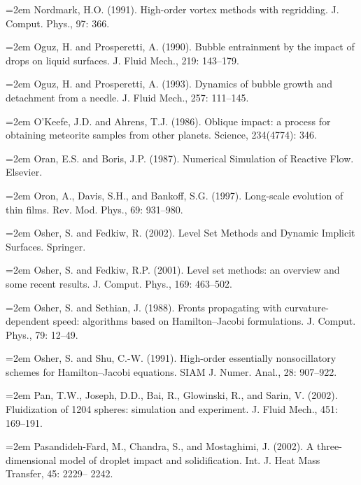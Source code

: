 \documentclass[11pt,a4paper,openany,fontset=none]{ctexbook}
\begin{document}
\par\hangindent=2em Nordmark, H.O. (1991). High-order vortex methods with regridding. J. Comput. Phys., 97: 366.

\par\hangindent=2em Oguz, H. and Prosperetti, A. (1990). Bubble entrainment by the impact of drops on liquid surfaces. J. Fluid Mech., 219: 143--179.

\par\hangindent=2em Oguz, H. and Prosperetti, A. (1993). Dynamics of bubble growth and detachment from a needle. J. Fluid Mech., 257: 111--145.

\par\hangindent=2em O’Keefe, J.D. and Ahrens, T.J. (1986). Oblique impact: a process for obtaining meteorite samples from other planets. Science, 234(4774): 346.

\par\hangindent=2em Oran, E.S. and Boris, J.P. (1987). Numerical Simulation of Reactive Flow. Elsevier.

\par\hangindent=2em Oron, A., Davis, S.H., and Bankoff, S.G. (1997). Long-scale evolution of thin films. Rev. Mod. Phys., 69: 931--980.

\par\hangindent=2em Osher, S. and Fedkiw, R. (2002). Level Set Methods and Dynamic Implicit Surfaces. Springer.

\par\hangindent=2em Osher, S. and Fedkiw, R.P. (2001). Level set methods: an overview and some recent results. J. Comput. Phys., 169: 463--502.

\par\hangindent=2em Osher, S. and Sethian, J. (1988). Fronts propagating with curvature-dependent speed: algorithms based on Hamilton--Jacobi formulations. J. Comput. Phys., 79: 12--49.

\par\hangindent=2em Osher, S. and Shu, C.-W. (1991). High-order essentially nonsocillatory schemes for Hamilton--Jacobi equations. SIAM J. Numer. Anal., 28: 907--922.

\par\hangindent=2em Pan, T.W., Joseph, D.D., Bai, R., Glowinski, R., and Sarin, V. (2002). Fluidization of 1204 spheres: simulation and experiment. J. Fluid Mech., 451: 169--191.

\par\hangindent=2em Pasandideh-Fard, M., Chandra, S., and Mostaghimi, J. (2002). A three-dimensional model of droplet impact and solidification. Int. J. Heat Mass Transfer, 45: 2229-- 2242.
\end{document}
